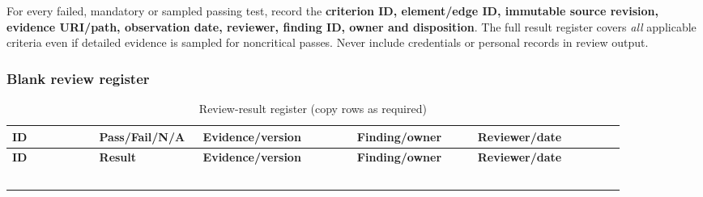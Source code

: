\documentclass[10pt,letterpaper]{article}
\begin{document}
For every failed, mandatory or sampled passing test, record the \textbf{criterion ID, element/edge ID, immutable source revision, evidence URI/path, observation date, reviewer, finding ID, owner and disposition}. The full result register covers \emph{all} applicable criteria even if detailed evidence is sampled for noncritical passes. Never include credentials or personal records in review output.

\subsubsection{Blank review register}
\begin{longtable}{@{}>{\raggedright\arraybackslash}p{0.13\linewidth}>{\raggedright\arraybackslash}p{0.12\linewidth}>{\raggedright\arraybackslash}p{0.23\linewidth}>{\raggedright\arraybackslash}p{0.18\linewidth}>{\raggedright\arraybackslash}p{0.22\linewidth}@{}}
\caption{Review-result register (copy rows as required)}\label{tab:review-register}\\
\toprule\textbf{ID} & \textbf{Pass/\allowbreak Fail/\allowbreak N/A} & \textbf{Evidence/version} & \textbf{Finding/owner} & \textbf{Reviewer/date}\\\midrule\endfirsthead
\toprule\textbf{ID} & \textbf{Result} & \textbf{Evidence/version} & \textbf{Finding/owner} & \textbf{Reviewer/date}\\\midrule\endhead
\bottomrule\endlastfoot
\rule{0pt}{18pt}& & & & \\\midrule
\rule{0pt}{18pt}& & & & \\\midrule
\rule{0pt}{18pt}& & & & \\\midrule
\rule{0pt}{18pt}& & & & \\\midrule
\rule{0pt}{18pt}& & & & \\
\end{longtable}
\end{document}
